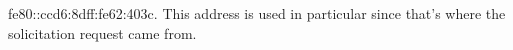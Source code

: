 fe80::ccd6:8dff:fe62:403c. This address is used in particular since that's where the solicitation request came from.